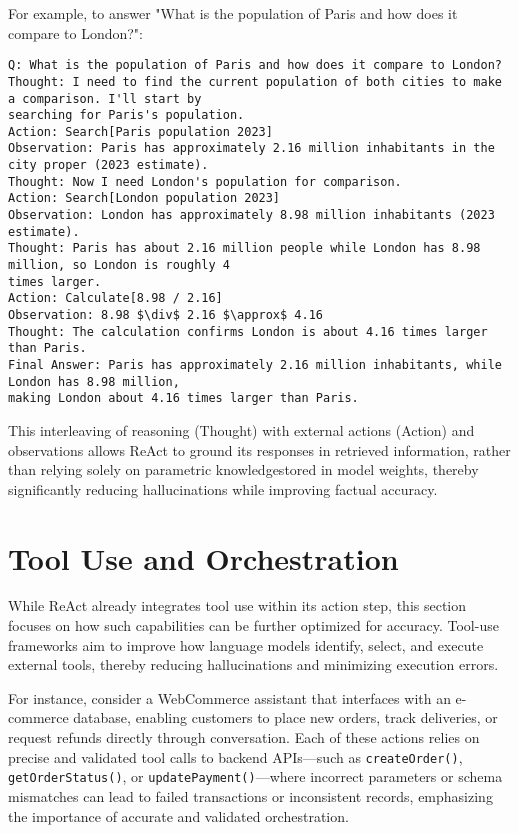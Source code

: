 For example, to answer "What is the population of Paris and how does it compare to London?":

\begin{lstlisting}[language={},breaklines=true,basicstyle=\ttfamily\footnotesize,caption={ReAct Example: Population Comparison Query}]
Q: What is the population of Paris and how does it compare to London?
Thought: I need to find the current population of both cities to make a comparison. I'll start by 
searching for Paris's population.
Action: Search[Paris population 2023]
Observation: Paris has approximately 2.16 million inhabitants in the city proper (2023 estimate).
Thought: Now I need London's population for comparison.
Action: Search[London population 2023]
Observation: London has approximately 8.98 million inhabitants (2023 estimate).
Thought: Paris has about 2.16 million people while London has 8.98 million, so London is roughly 4 
times larger.
Action: Calculate[8.98 / 2.16]
Observation: 8.98 $\div$ 2.16 $\approx$ 4.16
Thought: The calculation confirms London is about 4.16 times larger than Paris.
Final Answer: Paris has approximately 2.16 million inhabitants, while London has 8.98 million, 
making London about 4.16 times larger than Paris.
\end{lstlisting}

This interleaving of reasoning (Thought) with external actions (Action) and observations allows ReAct to ground its responses in retrieved information, rather than relying solely on parametric knowledgestored in model weights, thereby significantly reducing hallucinations while improving factual accuracy.
\section{Tool Use and Orchestration}

While ReAct already integrates tool use within its action step, this section focuses on how such capabilities can be further optimized for accuracy.  
Tool-use frameworks aim to improve how language models identify, select, and execute external tools, thereby reducing hallucinations and minimizing execution errors.  

For instance, consider a WebCommerce assistant that interfaces with an e-commerce database, enabling customers to place new orders, track deliveries, or request refunds directly through conversation.
Each of these actions relies on precise and validated tool calls to backend APIs—such as \texttt{createOrder()}, \texttt{getOrderStatus()}, or \texttt{updatePayment()}—where incorrect parameters or schema mismatches can lead to failed transactions or inconsistent records, emphasizing the importance of accurate and validated orchestration. 

